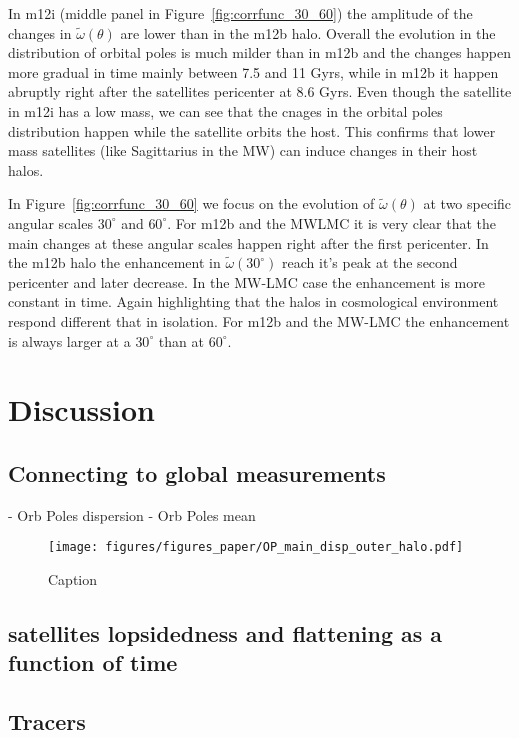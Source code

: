 \documentclass{aastex63}
\begin{document}
In m12i (middle panel in Figure~\ref{fig:corrfunc_30_60}) the amplitude of the changes in $\tilde{\omega}(\theta)$ are lower than in the m12b halo. Overall the evolution in the distribution of orbital poles is much milder than in m12b and the changes happen more gradual in time mainly between 7.5 and 11 Gyrs, while in m12b it happen abruptly right after the satellites pericenter at 8.6 Gyrs. Even though the satellite in m12i has a low mass, we can see that the cnages in the orbital poles distribution happen while the satellite orbits the host. This confirms that lower mass satellites (like Sagittarius in the MW) can induce changes in their host halos.    

In Figure~\ref{fig:corrfunc_30_60} we focus on the evolution of $\tilde{\omega}(\theta)$ at two specific angular scales $30^{\circ}$ and $60^{\circ}$. For m12b and the MWLMC it is very clear that the main changes at these angular scales happen right after the first pericenter. In the m12b halo the enhancement in $\tilde{\omega}(30^{\circ})$ reach it's peak at the second pericenter and later decrease. In the MW-LMC case the enhancement is more constant in time. Again highlighting that the halos in cosmological environment respond different that in isolation. 
For m12b and the MW-LMC the enhancement is always larger at a $30^{\circ}$ than at $60^{\circ}$.  


\section{Discussion}


\subsection{Connecting to global measurements}\label{sec:global}

- Orb Poles dispersion
- Orb Poles mean

\begin{figure*}[h]
    \centering
    \texttt{[image: figures/figures\_paper/OP\_main\_disp\_outer\_halo.pdf]}
    \caption{Caption}
    \label{fig:OP_disp}
\end{figure*}


\subsection{satellites lopsidedness and flattening as a function of time}

\subsection{Tracers}
\end{document}
